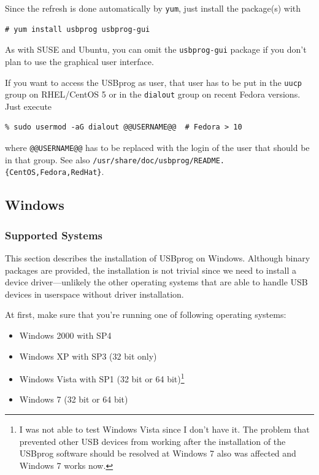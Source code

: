 \documentclass[bibtotoc,UKenglish,halfparskip,oneside,DIV12]{scrreprt}
\begin{document}
Since the refresh is done automatically by \texttt{yum}, just install the package(s) with

\begin{lstlisting}[style=inline]
# yum install usbprog usbprog-gui
\end{lstlisting}

As with SUSE and Ubuntu, you can omit the \texttt{usbprog-gui} package if you don't plan to use the
graphical user interface.

If you want to access the USBprog as user, that user has to be put in the \texttt{uucp} group on
RHEL/CentOS 5 or in the \texttt{dialout} group on recent Fedora versions. Just execute

\begin{lstlisting}[style=inline]
% sudo usermod -aG uucp @@USERNAME@@     # RHEL 5, CentOS 5
% sudo usermod -aG dialout @@USERNAME@@  # Fedora > 10
\end{lstlisting}

where \texttt{@@USERNAME@@} has to be replaced with the login of the user that should be in that
group.  See also \texttt{/usr/share/doc/usbprog/README.\{CentOS,Fedora,RedHat\}}.

\subsection{Windows}

\subsubsection{Supported Systems}

This section describes the installation of USBprog on Windows. Although binary packages are
provided, the installation is not trivial since we need to install a device driver---unlikely the
other operating systems that are able to handle USB devices in userspace without driver
installation.

At first, make sure that you're running one of following operating systems:

\begin{itemize}
  \item Windows 2000 with SP4
  \item Windows XP with SP3 (32 bit only)
  \item Windows Vista with SP1 (32 bit or 64 bit)\footnote{I was not able to test Windows Vista since
    I don't have it. The problem that prevented other USB devices from working after the
    installation of the USBprog software should be resolved at Windows 7 also was affected and
    Windows 7 works now.}
  \item Windows 7 (32 bit or 64 bit)
\end{itemize}
\end{document}
